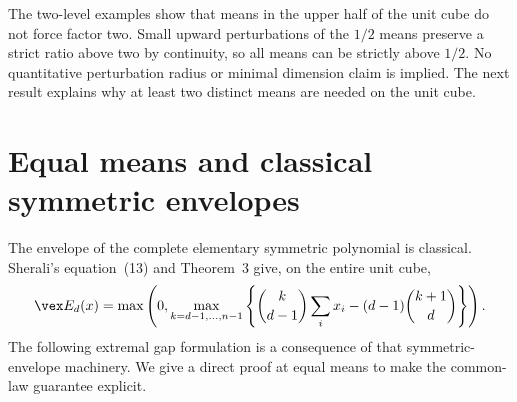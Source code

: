 The two-level examples show that means in the upper half of the unit
cube do not force factor two. Small upward perturbations of the $1/2$
means preserve a strict ratio above two by continuity, so all means can
be strictly above $1/2$. No quantitative perturbation radius or minimal
dimension claim is implied. The next result explains why at least two
distinct means are needed on the unit cube.

\section{Equal means and classical symmetric envelopes}\label{sec:equal-means}
The envelope of the complete elementary symmetric polynomial is classical.
Sherali's equation~(13) and Theorem~3 \citep[pp.~252--253]{Sherali1997}
give, on the entire unit cube,
\begin{equation}\label{eq:sherali-symmetric}
 \vex E_d(x)=\max\left(0,
  \max_{k=d-1,\ldots,n-1}
  \left\{\binom{k}{d-1}\sum_i x_i-(d-1)\binom{k+1}{d}\right\}\right).
\end{equation}
The following extremal gap formulation is a consequence of that
symmetric-envelope machinery. We give a direct proof at equal means to
make the common-law guarantee explicit.

